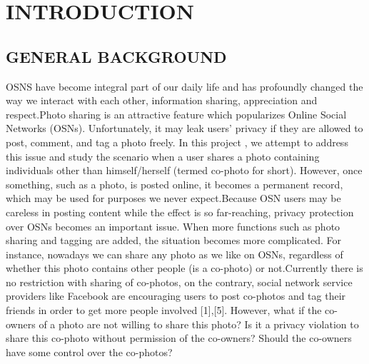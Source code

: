 

\chapter[INTRODUCTION]{\fontsize{16}{12}\selectfont INTRODUCTION}


\section[General Background]{\fontsize{14}{12}\selectfont \MakeUppercase{GENERAL BACKGROUND}}
OSNS have become integral part of our daily life and has profoundly changed the way we interact with each other, information sharing, appreciation and respect.Photo sharing is an attractive feature which popularizes Online Social Networks (OSNs). Unfortunately, it may leak users’ privacy if they are allowed to post, comment, and tag a photo freely. In this project , we attempt to address this issue and study the scenario when a user shares a photo containing individuals other than himself/herself (termed co-photo for short). However, once something, such as a photo, is posted online, it becomes a permanent record, which may be used for purposes we never expect.Because OSN users may be careless in posting content while the effect is so far-reaching, privacy protection over OSNs becomes an important issue. When more functions such as photo sharing and tagging are added, the situation becomes more complicated. For instance, nowadays we can share any photo as we like on OSNs, regardless of whether this photo contains other people (is a co-photo) or not.Currently there is no restriction with sharing of co-photos, on the contrary, social network service providers like Facebook are encouraging users to post co-photos and tag their friends in order to get more people involved [1],[5]. However, what if the co-owners of a photo are not willing to share this photo? Is it a privacy violation to share this co-photo without permission of the co-owners? Should the co-owners have some control over the co-photos?
 

